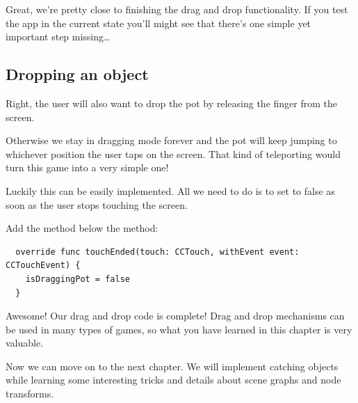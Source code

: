 Great, we're pretty close to finishing the drag and drop functionality. If you
test the app in the current state you'll might see that there's one simple yet
important step missing\ldots

\subsection{Dropping an object}
Right, the user will also want to drop the pot by releasing the finger from the
screen. 

Otherwise we stay in dragging mode forever and the pot will keep jumping
to whichever position the user taps on the screen. That kind of teleporting
would turn this game into a very simple one!

Luckily this can be easily implemented. All we need to do is to set
 to false as soon as the user stops touching the
screen.
\begin{leftbar}
Add the  method below the  method:
\begin{lstlisting}
  override func touchEnded(touch: CCTouch, withEvent event: CCTouchEvent) {
    isDraggingPot = false
  }
\end{lstlisting}
\end{leftbar}
Awesome! Our drag and drop code is complete! Drag and drop mechanisms can be
used in many types of games, so what you have learned in this chapter is very
valuable.

Now we can move on to the next chapter. We will implement catching objects while
learning some interesting tricks and details about scene graphs and node
transforms.
